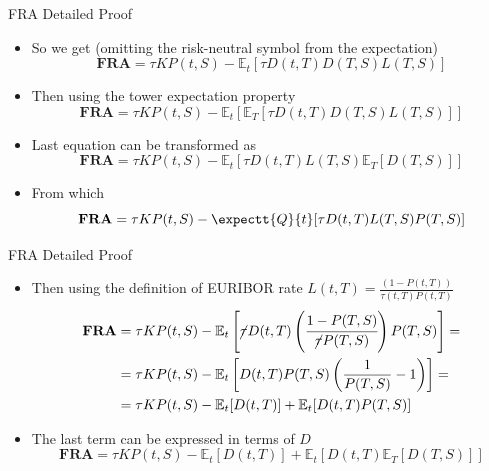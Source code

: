 \documentclass{beamer}
\begin{document}
\begin{frame}{FRA Detailed Proof}
	\begin{itemize}
		\item<1-> So we get (omitting the risk-neutral symbol from the expectation)
		\begin{equation*}
			\textbf{FRA} = \tau KP(t,S)-\mathbb{E}_t[\tau D(t,T)D(T,S)L(T,S)]
		\end{equation*}
		\item<2-> Then using the tower expectation property
		\begin{equation*}
		\textbf{FRA} = \tau KP(t,S) - \mathbb{E}_t[\mathbb{E}_T[\tau D(t,T)D(T,S)L(T,S)]]
		\end{equation*}
		\item<3-> Last equation can be transformed as
		\begin{equation*}
			\textbf{FRA} = \tau KP(t,S) - \mathbb{E}_t[\tau D(t,T)L(T,S)\mathbb{E}_T[D(T,S)]]
		\end{equation*}
		\item<4-> From which
		\begin{equation*}
		\textbf{FRA} = \tau KP(t,S) - \expectt{Q}{t}[\tau D(t,T)L(T,S)P(T,S)]
		\end{equation*}
	\end{itemize}
\end{frame}

\begin{frame}{FRA Detailed Proof}
	\begin{itemize}
		\item<1-> Then using the definition of EURIBOR rate $L(t,T)=\frac{(1-P(t,T))}{\tau(t,T)P(t,T)}$
		\begin{equation*}
			\begin{aligned}
			\textbf{FRA} &= \tau KP(t,S) - \mathbb{E}_t\left[\cancel{\tau}D(t,T)\left(\cfrac{1-P(T,S)}{\cancel{\tau} P(T,S)}\right)P(T,S)\right] = \\
			&=\tau KP(t,S)-\mathbb{E}_t\left[D(t,T)P(T,S)\left(\frac{1}{P(T,S)}-1\right)\right]= \\
			&=\tau KP(t,S)-\mathbb{E}_t[D(t,T)] + \mathbb{E}_t[D(t,T)P(T,S)]
			\end{aligned}
		\end{equation*}
		\item<2-> The last term can be expressed in terms of $D$
		\begin{equation*}
			\textbf{FRA} = \tau KP(t,S)-\mathbb{E}_t[D(t,T)] + \mathbb{E}_t\left[D(t,T)\mathbb{E}_T[D(T,S)]\right]
		\end{equation*}		
	\end{itemize}
\end{frame}
\end{document}
